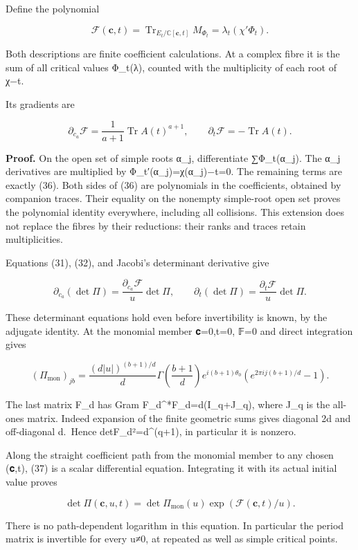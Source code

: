 \documentclass[
  11pt,
]{article}
\begin{document}
Define the polynomial

\[
\boxed{\mathcal F(\mathbf c,t)
 =\operatorname{Tr}_{E_t/\mathbb C[\mathbf c,t]}M_{\Phi_t}
 =\lambda_t(\chi'\Phi_t).}
\tag{35}
\]

Both descriptions are finite coefficient calculations. At a complex
fibre it is the sum of all critical values Φ\_t(λ), counted with the
multiplicity of each root of χ−t.

Its gradients are

\[
\boxed{
\partial_{c_a}\mathcal F
 =\frac1{a+1}\operatorname{Tr}A(t)^{a+1},
\qquad
\partial_t\mathcal F=-\operatorname{Tr}A(t).
}
\tag{36}
\]

\textbf{Proof.} On the open set of simple roots α\_j, differentiate
∑Φ\_t(α\_j). The α\_j derivatives are multiplied by
Φ\_t′(α\_j)=χ(α\_j)−t=0. The remaining terms are exactly (36). Both
sides of (36) are polynomials in the coefficients, obtained by companion
traces. Their equality on the nonempty simple-root open set proves the
polynomial identity everywhere, including all collisions. This extension
does not replace the fibres by their reductions: their ranks and traces
retain multiplicities.

Equations (31), (32), and Jacobi's determinant derivative give

\[
\partial_{c_a}(\det\Pi)
 =\frac{\partial_{c_a}\mathcal F}u\det\Pi,
\qquad
\partial_t(\det\Pi)
 =\frac{\partial_t\mathcal F}u\det\Pi.
\tag{37}
\]

These determinant equations hold even before invertibility is known, by
the adjugate identity. At the monomial member 𝐜=0,t=0, 𝔽=0 and direct
integration gives

\[
(\Pi_{\mathrm{mon}})_{jb}
 =\frac{(d|u|)^{(b+1)/d}}d
 \Gamma\!\left(\frac{b+1}d\right)
 e^{i(b+1)\theta_0}
 (e^{2\pi i j(b+1)/d}-1).
\tag{38}
\]

The last matrix F\_d has Gram F\_d\^{}*F\_d=d(I\_q+J\_q), where J\_q is
the all-ones matrix. Indeed expansion of the finite geometric sums gives
diagonal 2d and off-diagonal d.~Hence
\textbar detF\_d\textbar²=d\^{}(q+1), in particular it is nonzero.

Along the straight coefficient path from the monomial member to any
chosen (𝐜,t), (37) is a scalar differential equation. Integrating it
with its actual initial value proves

\[
\boxed{
\det\Pi(\mathbf c,u,t)
 =\det\Pi_{\mathrm{mon}}(u)\exp(\mathcal F(\mathbf c,t)/u).
}
\tag{39}
\]

There is no path-dependent logarithm in this equation. In particular the
period matrix is invertible for every u≠0, at repeated as well as simple
critical points.
\end{document}

